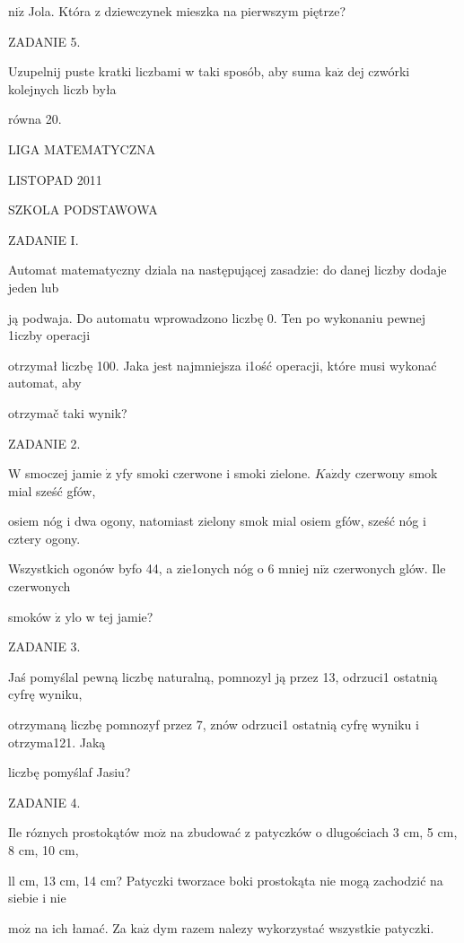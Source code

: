 \documentclass[a4paper,12pt]{article}
\begin{document}
$\mathrm{n}\mathrm{i}\dot{\mathrm{z}}$ Jola. Która z dziewczynek mieszka na pierwszym piętrze?

ZADANIE 5.

Uzupelnij puste kratki liczbami w taki sposób, aby suma $\mathrm{k}\mathrm{a}\dot{\mathrm{z}}$ dej czwórki kolejnych liczb była

równa 20.






LIGA MATEMATYCZNA

LISTOPAD 2011

SZKOLA PODSTAWOWA

ZADANIE I.

Automat matematyczny dziala na następującej zasadzie: do danej liczby dodaje jeden lub

ją podwaja. Do automatu wprowadzono liczbę 0. Ten po wykonaniu pewnej 1iczby operacji

otrzymał liczbę 100. Jaka jest najmniejsza i1ość operacji, które musi wykonać automat, aby

otrzymač taki wynik?

ZADANIE 2.

$\mathrm{W}$ smoczej jamie $\dot{\mathrm{z}}$ yfy smoki czerwone i smoki zielone. $K\mathrm{a}\dot{\mathrm{z}}\mathrm{d}\mathrm{y}$ czerwony smok mial sześć gfów,

osiem nóg i dwa ogony, natomiast zielony smok mial osiem gfów, sześć nóg i cztery ogony.

Wszystkich ogonów byfo 44, a zie1onych nóg o 6 mniej $\mathrm{n}\mathrm{i}\dot{\mathrm{z}}$ czerwonych glów. Ile czerwonych

smoków $\dot{\mathrm{z}}$ ylo w tej jamie?

ZADANIE 3.

Jaś pomyślal pewną liczbę naturalną, pomnozyl ją przez 13, odrzuci1 ostatnią cyfrę wyniku,

otrzymaną liczbę pomnozyf przez 7, znów odrzuci1 ostatnią cyfrę wyniku i otrzyma121. Jaką

liczbę pomyślaf Jasiu?

ZADANIE 4.

Ile róznych prostokątów $\mathrm{m}\mathrm{o}\dot{\mathrm{z}}$ na zbudować z patyczków o dlugościach 3 cm, 5 cm, 8 cm, 10 cm,

ll cm, 13 cm, 14 cm? Patyczki tworzace boki prostokąta nie mogą zachodzić na siebie i nie

$\mathrm{m}\mathrm{o}\dot{\mathrm{z}}$ na ich łamać. Za $\mathrm{k}\mathrm{a}\dot{\mathrm{z}}$ dym razem nalezy wykorzystać wszystkie patyczki.
\end{document}

